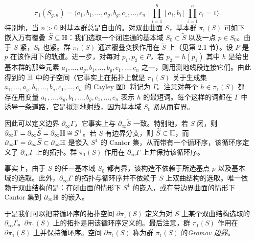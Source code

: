 \begin{equation}
\pi_1(\bar S_{g,n})=\Big\langle a_1,b_1,\dots,a_g,b_g,c_1,\dots,c_n\ \Big|\ \prod_{i=1}^{g}[a_i,b_i]\prod_{i=1}^{n}c_i=1\Big\rangle . \tag{4.4}
\end{equation}
特别地，当 $n>0$ 时基本群总是自由的。对双曲曲面 $S$，基本群 $\pi_1(S)$ 可如下嵌入万有覆叠 $\widetilde{S}\subseteq\mathbb{H}$：我们选取一个闭连通的基本域 $S_0\subset\widetilde{S}$ 以及一点 $p\in S_0$。由于 $S$ 紧，$S_0$ 也紧。群 $\pi_1(S)$ 通过覆叠变换作用在 $\widetilde{S}$ 上（见第 2.1 节）。设 $P$ 是 $p$ 在该作用下的轨道。进一步，对每对 $p_1,p_2\in P$，若 $p_2=h(p_1)$ 其中 $h$ 是给出基本群的那些元素 $a_1,\dots,a_g,b_1,\dots,b_g,c_1,\dots,c_n$ 之一，则用测地线段连接它们。由此得到的 $\mathbb{H}$ 中的子空间（它事实上在拓扑上就是 $\pi_1(S)$ 关于生成集 $a_1,\dots,a_g,b_1,\dots,b_g,c_1,\dots,c_n$ 的 Cayley 图）将记为 $\Gamma$。注意对每个 $h\in\pi_1(S)$ 都存在用变量 $a_1,\dots,a_g,b_1,\dots,b_g,c_1,\dots,c_n$ 表示 $h$ 的最短词。每个这样的词都在 $\Gamma$ 中诱导一条道路，它是拟测地射线，因为基本域 $S_0$ 紧从而有界。


因此可以定义边界 $\partial_\infty\Gamma$，它事实上与 $\partial_\infty\widetilde{S}$ 一致。特别地，若 $S$ 闭，则 $\partial_\infty\Gamma=\partial_\infty\widetilde{S}=\partial_\infty\mathbb{H}\cong S^1$。若 $S$ 有边界分支，则 $\widetilde{S}\subset\mathbb{H}$，而 $\partial_\infty\Gamma=\partial_\infty\widetilde{S}\subset\partial_\infty\mathbb{H}$ 是嵌入 $S^1$ 的 Cantor 集，从而带有一个循环序，该循环序定义了 $\partial_\infty\Gamma$ 上的拓扑。群 $\pi_1(S)$ 作用在 $\partial_\infty\Gamma$ 上并保持该循环序。

事实上，由于 $S$ 的任一基本域 $S_0$ 都有界，该构造不依赖于所选基点 $p$ 以及基本域的选取。此外，$\partial_\infty\Gamma$ 的拓扑与循环序并不依赖于 $S$ 上双曲结构的选取。唯一依赖于双曲结构的是：在闭曲面的情形下 $S^1$ 的嵌入，或在带边界曲面的情形下 Cantor 集到 $\partial_\infty\mathbb{H}$ 的嵌入。

于是我们可以把带循环序的拓扑空间 $\partial\pi_1(S)$ 定义为对 $S$ 上某个双曲结构选取的 $\partial_\infty\Gamma$。$\partial\pi_1(S)$ 上的拓扑是用该循环序定义的。最后注意，群 $\pi_1(S)$ 作用在 $\partial\pi_1(S)$ 上并保持循环序。空间 $\partial\pi_1(S)$ 称为群 $\pi_1(S)$ 的\emph{Gromov 边界}。

